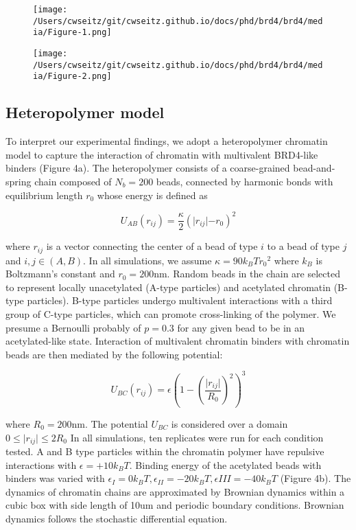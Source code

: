 \begin{figure}[t]
\texttt{[image: /Users/cwseitz/git/cwseitz.github.io/docs/phd/brd4/brd4/media/Figure-1.png]}
\caption{}
\end{figure}

\begin{figure}[t]
\texttt{[image: /Users/cwseitz/git/cwseitz.github.io/docs/phd/brd4/brd4/media/Figure-2.png]}
\caption{}
\end{figure}

\subsection{Heteropolymer model}

To interpret our experimental findings, we adopt a heteropolymer chromatin model to capture the interaction of chromatin with multivalent BRD4-like binders (Figure 4a). The heteropolymer consists of a coarse-grained bead-and-spring chain composed of $N_b=200$ beads, connected by harmonic bonds with equilibrium length $r_0$ whose energy is deﬁned as

\begin{equation*}
U_{AB}(r_{ij})=\frac{\kappa}{2}(\lvert r_{ij}\lvert-r_0)^2
\end{equation*}

where $r_{ij}$ is a vector connecting the center of a bead of type $i$ to a bead of type $j$ and $i,j \in (A,B)$. In all simulations, we assume $\kappa=90k_{B}T{r_0}^2$ where $k_{B}$ is Boltzmann’s constant and $r_0=200$nm. Random beads in the chain are selected to represent locally unacetylated (A-type particles) and acetylated chromatin (B-type particles).  B-type particles undergo multivalent interactions with a third group of C-type particles, which can promote cross-linking of the polymer. We presume a Bernoulli probably of $p=0.3$ for any given bead to be in an acetylated-like state. Interaction of multivalent chromatin binders with chromatin beads are then mediated by the following potential:

\begin{equation*}
U_{BC}\left(r_{ij}\right)=\epsilon\left(1-\left(\frac{\lvert r_{ij}\lvert}{R_0}\right)^2\right)^3
\end{equation*}

where $R_0=200$nm. The potential $U_{BC}$ is considered over a domain $0\leq\lvert r_{ij}\lvert\leq 2 R_0$ In all simulations, ten replicates were run for each condition tested. A and B type particles within the chromatin polymer have repulsive interactions with $\epsilon = +10k_{B}T$. Binding energy of the acetylated beads with binders was varied with $\epsilon_{I} = 0 k_{B}T,\epsilon_{II} = -20k_{B}T,\epsilon{III}=-40k_{B}T$ (Figure 4b). The dynamics of chromatin chains are approximated by Brownian dynamics within a cubic box with side length of 10um and periodic boundary conditions. Brownian dynamics follows the stochastic differential equation.

